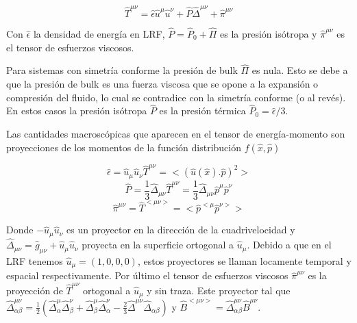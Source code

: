 \documentclass[11pt,a4paper]{article}
\begin{document}
\begin{equation}
\hat{T}^{{\mu}{\nu}}= \hat{\epsilon}\hat{u}^{\mu}\hat{u}^{\nu}+\hat{P}\hat{\Delta}^{{\mu}{\nu}}+\hat{\pi}^{{\mu}{\nu}}
\end{equation}

Con $\hat{\epsilon}$ la densidad de energía en LRF, $\hat{P}=\hat{P}_{0}+\hat{\Pi}$ es la presión isótropa y $\hat{\pi}^{{\mu}{\nu}}$ es el tensor de esfuerzos viscosos.

Para sistemas con simetría conforme la presión de bulk $\hat{\Pi}$ es nula. Esto se debe a que la presión de bulk es una fuerza viscosa que se opone a la expansión o compresión del fluido, lo cual se contradice con la simetría conforme (o al revés). En estos casos la presión isótropa  $\hat{P}$ es la presión térmica $\hat{P}_{0}=\hat{\epsilon}/3$.

Las cantidades macroscópicas que aparecen en el tensor de energía-momento son proyecciones de los momentos de la función distribución $f( \hat{x}, \hat{p})$

\begin{equation}
\hat{\epsilon}=\hat{u}_{\mu}\hat{u}_{\nu}\hat{T}^{{\mu}{\nu}}=<(\hat{u}(\hat{x}).\hat{p})^2>
\end{equation}
\begin{equation}
\hat{P}=\frac{1}{3}\hat{\Delta}_{{\mu}{\nu}}\hat{T}^{{\mu}{\nu}}= \frac{1}{3}\hat{\Delta}_{{\mu}{\nu}}\hat{p}^{\mu}\hat{p}^{\nu}
\end{equation}
\begin{equation}
\hat{\pi}^{{\mu}{\nu}}= \hat{T}^{<{\mu}{\nu}>}=<\hat{p}^{<\mu}\hat{p}^{\nu>}>
\end{equation}

Donde $-\hat{u}_{\mu}\hat{u}_{\nu}$ es un proyector en la dirección de la cuadrivelocidad y $\hat{\Delta}_{{\mu}{\nu}}=\hat{g}_{{\mu}{\nu}}+\hat{u}_{\mu}\hat{u}_{\nu}$  proyecta en la superficie ortogonal a $\hat{u}_{\mu}$. Debido a que en el LRF tenemos $\hat{u}_{\mu}=(1,0,0,0)$, estos proyectores se llaman locamente temporal y espacial respectivamente.
Por último el tensor de esfuerzos viscosos $\hat{\pi}^{{\mu}{\nu}}$ es la proyección de $\hat{T}^{{\mu}{\nu}}$ ortogonal a $\hat{u}_{\mu}$ y sin traza. Este proyector tal que $\hat{\Delta}^{{\mu}{\nu}}_{{\alpha}{\beta}}=\frac{1}{2}(\hat{\Delta}^{\mu}_{\alpha}\hat{\Delta}^{\nu}_{\beta}+\hat{\Delta}^{\mu}_{\beta}\hat{\Delta}^{\nu}_{\alpha}-\frac{2}{3}\hat{\Delta}^{{\mu}{\nu}}\hat{\Delta}_{{\alpha}{\beta}})$ y $\hat{B}^{<{\mu}{\nu}>}=\hat{\Delta}^{{\mu}{\nu}}_{{\alpha}{\beta}}\hat{B}^{{\mu}{\nu}}$.
\end{document}
